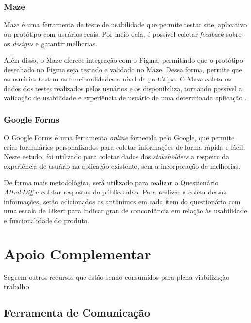 \subsubsection{Maze}
\label{sec:Maze}
Maze é uma ferramenta de teste de usabilidade que permite testar site, aplicativo ou protótipo com usuários reais. Por meio dela, é possível coletar \textit{feedback} sobre 
os \textit{designs} e garantir melhorias.

Além disso, o Maze oferece integração com o Figma, permitindo que o protótipo desenhado no Figma seja testado e validado no Maze. Dessa forma, permite que os usuários 
testem as funcionalidades a nível de protótipo. O Maze coleta os dados dos testes realizados pelos usuários e os disponibiliza, tornando possível a validação de usabilidade 
e experiência de usuário de uma determinada aplicação \cite{maze}.

\subsubsection{Google Forms}
\label{sec:Google Forms}
O Google Forms \cite{googleforms} é uma ferramenta \textit{online} fornecida pelo Google, que permite criar formulários personalizados para coletar informações de forma rápida e fácil. Neste estudo, foi 
utilizado para coletar dados dos \textit{stakeholders} a respeito da experiência de usuário na aplicação existente, sem a incorporação de melhorias.

De forma mais metodológica, será utilizado para realizar o Questionário \textit{AttrakDiff} e coletar respostas do público-alvo. Para realizar a coleta dessas informações, serão adicionados 
os antônimos em cada item do questionário com uma escala de Likert para indicar grau de concordância em relação às usabilidade e funcionalidade do produto.

\section{Apoio Complementar}
\label{sec:Apoio Complementar}
Seguem outros recursos que estão sendo consumidos para plena viabilização trabalho.

\subsection{Ferramenta de Comunicação}
\label{sec:Ferramenta de Comunicação}

